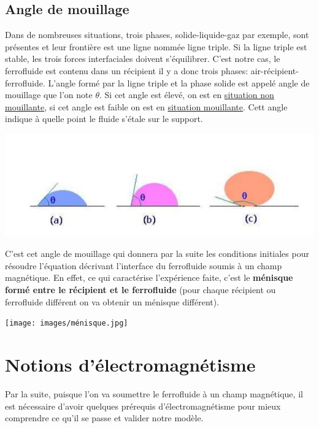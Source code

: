 \documentclass[10pt,a4paper]{article}
\begin{document}
\subsection{Angle de mouillage \cite{hydrodynamique}}
Dans de nombreuses situations, trois phases, solide-liquide-gaz par exemple, sont présentes et leur
frontière est une ligne nommée ligne triple. Si la ligne triple est stable, les trois forces interfaciales
doivent s'équilibrer. C'est notre cas, le ferrofluide est contenu dans un récipient il y a donc trois phases: air-récipient-ferrofluide. 
\newline
\newline
L'angle formé par la ligne triple et la phase solide est appelé angle de mouillage que l'on note $\theta$. Si cet angle est élevé, on est en \underline{situation non mouillante}, si cet angle est faible on est en \underline{situation mouillante}. Cett angle indique à quelle point le fluide s'étale sur le support.
\begin{center}
\includegraphics[scale=0.8]{images/mouillage.jpg} 
\label{fig08}
\end{center}
C'est cet angle de mouillage qui donnera par la suite les conditions initiales pour résoudre l'équation décrivant l'interface du ferrofluide soumis à un champ magnétique. En effet, ce qui caractérise l'expérience faite, c'est le \textbf{ménisque formé entre le récipient et le ferrofluide} (pour chaque récipient ou ferrofluide différent on va obtenir un ménisque différent).
\begin{center}
\texttt{[image: images/ménisque.jpg]} 
\label{fig09}
\end{center}
\section{Notions d'électromagnétisme}
Par la suite, puisque l'on va soumettre le ferrofluide à un champ magnétique, il est nécessaire d'avoir quelques prérequis d'électromagnétisme pour mieux comprendre ce qu'il se passe et valider notre modèle. 
\end{document}
